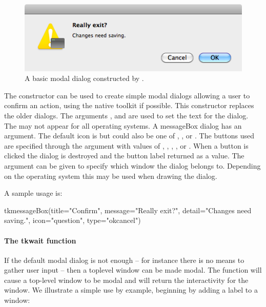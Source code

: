 \begin{figure}
  \centering
  \includegraphics[width=.6\textwidth]{fig-tcltk-confirm-dialog.png}
  \caption{A basic modal dialog constructed by .}
  \label{fig:fig-tcltk-confirm-dialog}
\end{figure}

The  constructor can be used to create
simple modal dialogs allowing a user to confirm an action, using the
native toolkit if possible. This constructor replaces the older
 dialogs. The arguments ,
 and 
are used to set the text for the dialog. The  may not
appear for all operating systems. A messageBox dialog has an
 argument. The default icon is
 but could also be one of , ,
or . The buttons used are specified through the
 argument with values of ,
, , , or
. When a button is clicked the dialog is destroyed
and the button label returned as a value. The argument
 can be given to specify which window
the dialog belongs to. Depending on the operating system this may be
used when drawing the dialog.

A sample usage is:
\begin{Schunk}
\begin{Sinput}
 tkmessageBox(title="Confirm", message="Really exit?", 
              detail="Changes need saving.", 
              icon="question", type="okcancel")
\end{Sinput}
\end{Schunk}

\paragraph{The tkwait function}
If the default modal dialog is not enough -- for instance there is no
means to gather user input -- then a toplevel window can be made
modal. The  function will cause a top-level window to
be modal and  will return the interactivity
for the window. We illustrate a simple use by example, beginning by
adding a label to a window:

